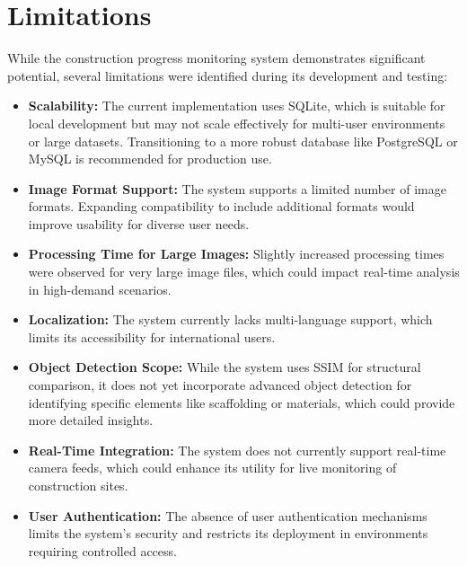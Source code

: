 \documentclass[12pt,a4paper]{report}
\begin{document}
\section{Limitations}
While the construction progress monitoring system demonstrates significant potential, several limitations were identified during its development and testing:
\begin{itemize}
    \item \textbf{Scalability:} The current implementation uses SQLite, which is suitable for local development but may not scale effectively for multi-user environments or large datasets. Transitioning to a more robust database like PostgreSQL or MySQL is recommended for production use.
    \item \textbf{Image Format Support:} The system supports a limited number of image formats. Expanding compatibility to include additional formats would improve usability for diverse user needs.
    \item \textbf{Processing Time for Large Images:} Slightly increased processing times were observed for very large image files, which could impact real-time analysis in high-demand scenarios.
    \item \textbf{Localization:} The system currently lacks multi-language support, which limits its accessibility for international users.
    \item \textbf{Object Detection Scope:} While the system uses SSIM for structural comparison, it does not yet incorporate advanced object detection for identifying specific elements like scaffolding or materials, which could provide more detailed insights.
    \item \textbf{Real-Time Integration:} The system does not currently support real-time camera feeds, which could enhance its utility for live monitoring of construction sites.
    \item \textbf{User Authentication:} The absence of user authentication mechanisms limits the system's security and restricts its deployment in environments requiring controlled access.
\end{itemize}
\end{document}
